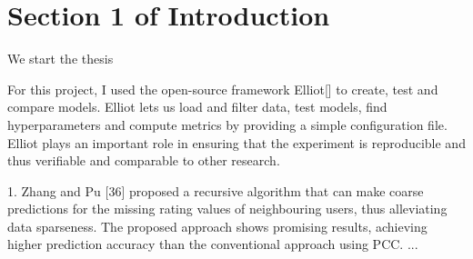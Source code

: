 \section{Section 1 of Introduction}

We start the thesis



For this project, I used the open-source framework Elliot[] to create, test and compare models. Elliot lets us load and filter data, test models, find hyperparameters and compute metrics by providing a simple configuration file. Elliot plays an important role in ensuring that the experiment is reproducible and thus verifiable and comparable to other research.

1. Zhang and Pu [36] proposed a recursive algorithm that can make coarse predictions for the missing rating values of neighbouring users, thus alleviating data sparseness. The proposed approach shows promising results, achieving higher prediction accuracy than the conventional approach using PCC. ...

